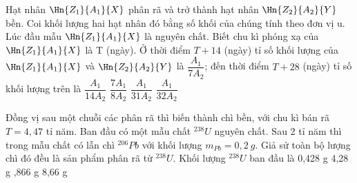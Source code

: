 \begin{vidu} %
Hạt nhân $\Hn{{Z_1}}{{A_1}}{X}$ phân rã và trở thành hạt nhân $\Hn{{Z_2}}{{A_2}}{Y}$ bền. Coi khối lượng hai hạt nhân đó bằng số khối của chúng tính theo đơn vị u. Lúc đầu mẫu $\Hn{{Z_1}}{{A_1}}{X}$ là nguyên chất. Biết chu kì phóng xạ của $\Hn{{Z_1}}{{A_1}}{X}$ là T (ngày). Ở thời điểm $T + 14$ (ngày) tỉ số khối lượng của $\Hn{{Z_1}}{{A_1}}{X}$ và $\Hn{{Z_2}}{{A_2}}{Y}$ là $\dfrac{A_1}{7{A_2}}$; đến thời điểm $T + 28$ (ngày) tỉ số khối lượng trên là
\choice
{$\dfrac{A_1}{14{A_2}}$}
{$\dfrac{7{A_1}}{8{A_2}}$}
{\True $\dfrac{A_1}{31{A_2}}$}
{$\dfrac{A_1}{32{A_2}}$}
\end{vidu}
\begin{vidu}%
Đồng vị  sau một chuỗi các phân rã thì biến thành chì  bền, với chu kì bán rã $T=4,47$ tỉ năm. Ban đầu có một mẫu chất $^{238}U$ nguyên chất. Sau 2 tỉ năm thì trong mẫu chất có lẫn chì $^{206}Pb$ với khối lượng $m_{Pb}=0,2\ g$. Giả sử toàn bộ lượng chì đó đều là sản phẩm phân rã từ $^{238}U$. Khối lượng $^{238}U$ ban đầu là
\choice
{0,428 g}
{4,28 g}
{,866 g}
{8,66 g}
\end{vidu}
